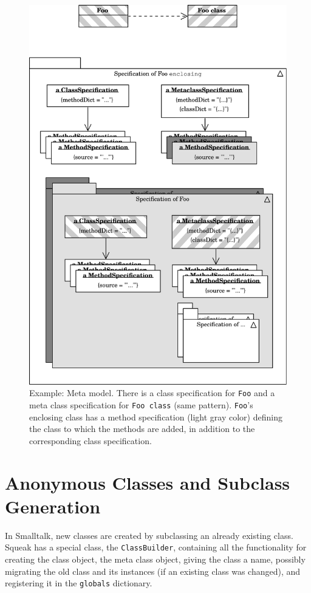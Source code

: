 \begin{figure}[!htp]
	\centering
	\includegraphics[width=\textwidth]{spec_example_r.pdf}
	\caption[Example: Meta model]{Example: Meta model. There is a class specification for \texttt{Foo} and a meta class specification for \texttt{Foo class} (same pattern). \texttt{Foo}'s enclosing class has a method specification (light gray color) defining the class to which the methods are added, in addition to the corresponding class specification.}
	\label{fig:impl_spec_example}
\end{figure}

\section{Anonymous Classes and Subclass Generation}
In Smalltalk, new classes are created by subclassing an already existing class. Squeak has a special class, the \texttt{ClassBuilder}, containing all the functionality for creating the class object, the meta class object, giving the class a name, possibly migrating the old class and its instances (if an existing class was changed), and registering it in the \texttt{globals} dictionary.

